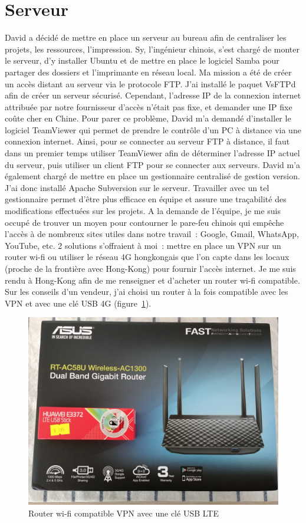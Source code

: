 \documentclass[a4paper, 12pt, sffamily]{report}
\begin{document}
\section{Serveur}
David a décidé de mettre en place un serveur au bureau afin de centraliser les projets, les ressources, l’impression. Sy, l’ingénieur chinois, s’est chargé de monter le serveur, d’y installer Ubuntu et de mettre en place le logiciel Samba pour partager des dossiers et l’imprimante en réseau local. Ma mission a été de créer un accès distant au serveur via le protocole FTP. J’ai installé le paquet VsFTPd afin de créer un serveur sécurisé. Cependant, l’adresse IP de la connexion internet attribuée par notre fournisseur d’accès n’était pas fixe, et demander une IP fixe coûte cher en Chine. Pour parer ce problème, David m’a demandé d’installer le logiciel TeamViewer qui permet de prendre le contrôle d’un PC à distance via une connexion internet. Ainsi, pour se connecter au serveur FTP à distance, il faut dans un premier temps utiliser TeamViewer afin de déterminer l’adresse IP actuel du serveur, puis utiliser un client FTP pour se connecter aux serveurs.
David m’a également chargé de mettre en place un gestionnaire centralisé de gestion version. J’ai donc installé Apache Subversion sur le serveur. Travailler avec un tel gestionnaire permet d’être plus efficace en équipe et assure une traçabilité des modifications effectuées sur les projets.
A la demande de l’équipe, je me suis occupé de trouver un moyen pour contourner le pare-feu chinois qui empêche l’accès à de nombreux sites utiles dans notre travail~: Google, Gmail, WhatsApp, YouTube, etc. 2 solutions s’offraient à moi~: mettre en place un VPN sur un router wi-fi ou utiliser le réseau 4G hongkongais que l’on capte dans les locaux (proche de la frontière avec Hong-Kong) pour fournir l’accès internet. Je me suis rendu à Hong-Kong afin de me renseigner et d’acheter un router wi-fi compatible. Sur les conseils d’un vendeur, j’ai choisi un router à la fois compatible avec les VPN et avec une clé USB 4G (figure~\ref{fig:wifi_router}).

\begin{figure}[H]
\centering
\includegraphics[scale=0.12]{figures/photos/wifi_router.jpg}
\caption{Router wi-fi compatible VPN avec une clé USB LTE}
\label{fig:wifi_router}
\end{figure}
\end{document}
